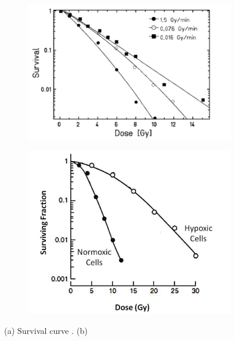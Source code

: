         \begin{figure}[h!]
            \begin{subfigure}{.5\textwidth}
            \centering
            \includegraphics[width=.98\linewidth]{figures/pixel_detectors_usage/survival_curve.png}
            \label{fig:}
            \end{subfigure}
            \begin{subfigure}{.5\textwidth}
                \centering
                \includegraphics[width=.80\linewidth]{figures/pixel_detectors_usage/survival_curve_oxygen.png}
                \label{fig:survival_curve_oxygen}
            \end{subfigure}
            \caption{(a) Survival curve . (b)}
            \label{fig:}
        \end{figure}

